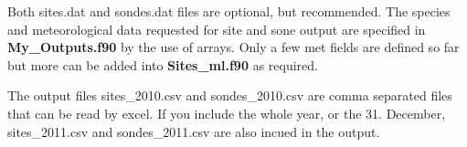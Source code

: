 Both sites.dat and sondes.dat files are optional, but recommended. 
The species and meteorological data requested for site and sone output
 are specified in {\bf My\_Outputs.f90} by the use of arrays. Only a 
few met fields are defined so far but more can be added into 
{\bf Sites\_ml.f90} as required. 

The output files sites\_2010.csv and sondes\_2010.csv are comma separated files 
that can be read by excel. If you include the whole year, or the 31. December, sites\_2011.csv 
and sondes\_2011.csv are also incued in the output.

% 



